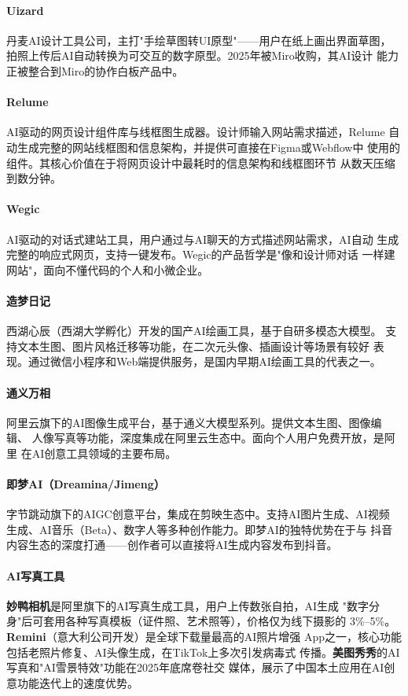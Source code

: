 \paragraph{Uizard}
丹麦AI设计工具公司，主打"手绘草图转UI原型"——用户在纸上画出界面草图，
拍照上传后AI自动转换为可交互的数字原型。2025年被Miro收购，其AI设计
能力正被整合到Miro的协作白板产品中。

\paragraph{Relume}
AI驱动的网页设计组件库与线框图生成器。设计师输入网站需求描述，Relume
自动生成完整的网站线框图和信息架构，并提供可直接在Figma或Webflow中
使用的组件。其核心价值在于将网页设计中最耗时的信息架构和线框图环节
从数天压缩到数分钟。

\paragraph{Wegic}
AI驱动的对话式建站工具，用户通过与AI聊天的方式描述网站需求，AI自动
生成完整的响应式网页，支持一键发布。Wegic的产品哲学是"像和设计师对话
一样建网站"，面向不懂代码的个人和小微企业。

\paragraph{造梦日记}
西湖心辰（西湖大学孵化）开发的国产AI绘画工具，基于自研多模态大模型。
支持文本生图、图片风格迁移等功能，在二次元头像、插画设计等场景有较好
表现。通过微信小程序和Web端提供服务，是国内早期AI绘画工具的代表之一。

\paragraph{通义万相}
阿里云旗下的AI图像生成平台，基于通义大模型系列。提供文本生图、图像编辑、
人像写真等功能，深度集成在阿里云生态中。面向个人用户免费开放，是阿里
在AI创意工具领域的主要布局。

\paragraph{即梦AI（Dreamina/Jimeng）}
字节跳动旗下的AIGC创意平台，集成在剪映生态中。支持AI图片生成、AI视频
生成、AI音乐（Beta）、数字人等多种创作能力。即梦AI的独特优势在于与
抖音内容生态的深度打通——创作者可以直接将AI生成内容发布到抖音。

\paragraph{AI写真工具}
\textbf{妙鸭相机}是阿里旗下的AI写真生成工具，用户上传数张自拍，AI生成
"数字分身"后可套用各种写真模板（证件照、艺术照等），价格仅为线下摄影的
3\%--5\%。\textbf{Remini}（意大利公司开发）是全球下载量最高的AI照片增强
App之一，核心功能包括老照片修复、AI头像生成，在TikTok上多次引发病毒式
传播。\textbf{美图秀秀}的AI写真和"AI雪景特效"功能在2025年底席卷社交
媒体，展示了中国本土应用在AI创意功能迭代上的速度优势。


